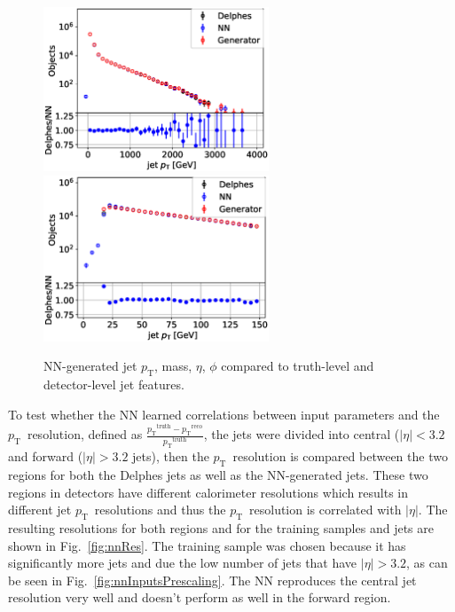 \documentclass[showpacs,showkeys,preprint,prd,nofootinbib,linenumbers,12pt]{revtex4-1}
\def\pt{\ensuremath{p_{\mathrm{T}}}}
\def\ptRes{\ensuremath{\pt^{\mathrm{truth}}-\pt^{\mathrm{reco}}}}
\begin{document}
\begin{figure}[htb]
  \includegraphics[width=0.6\textwidth]{figures/nn/jet_pT_genVsReco_origScale_test_batchSize10_log.eps}
  \includegraphics[width=0.6\textwidth]{figures/nn/jet_pT_genVsReco_origScale_zoom_test_batchSize10_log.eps}
  \caption{NN-generated jet \pt, mass, $\eta$, $\phi$ compared to truth-level and detector-level jet features. }
  \label{fig:nnVsDelphes}
\end{figure}

To test whether the NN learned correlations between input parameters and the \pt\ resolution, defined as $\frac{\ptRes}{\pt^{\text{truth}}}$, the jets were divided into central ($|\eta|<3.2$ and forward ($|\eta|>3.2$ jets), then the \pt\ resolution is compared between the two regions for both the Delphes jets as well as the NN-generated jets. These two regions in detectors have different calorimeter resolutions which results in different jet \pt\ resolutions and thus the \pt\ resolution is correlated with $|\eta|$. The resulting resolutions for both regions and for the training samples and jets are shown in Fig.~\ref{fig:nnRes}. The training sample was chosen because it has significantly more jets and due the low number of jets that have $|\eta|>3.2$, as can be seen in Fig.~\ref{fig:nnInputsPrescaling}. The NN reproduces the central jet resolution very well and doesn't perform as well in the forward region.
\end{document}
